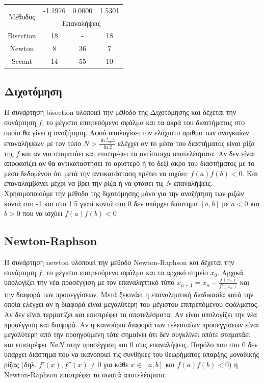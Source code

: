 \documentclass[a4paper,11pt]{article}
\begin{document}
\begin{flushleft}
    
    
\begin{table}[h]
    \centering
    \begin{tabular}{|c|c|c|c|}
        \hline
        \multirow{2}{*}{Μέθοδος} & -1.1976 & 0.0000 & 1.5301 \\ \cline{2-4}  & \multicolumn{3}{c|}{Επαναλήψεις} \\
        \hline
        Bisection & 18 & - & 18 \\ \hline
        Newton & 8 & 36 & 7 \\  \hline
        Secant & 14 & 55 & 10 \\ \hline
    \end{tabular}
\end{table}

\subsection*{Διχοτόμηση}
Η συνάρτηση bisection υλοποιεί την μέθοδο της Διχοτόμησης και δέχεται την συνάρτηση $f$, το μέγιστο επιτρεπόμενο σφάλμα και τα ακρά του διαστήματος στο οποίο θα γίνει η αναζήτηση. Αφού υπολογίσει τον ελάχιστο αριθμο των αναγκαίων επαναλήψεων με τον τύπο 
$N > \frac{\ln{\frac{b-a}{\epsilon}}}{\ln{2}}$ 
ελέγχει αν το μέσο του διαστήματος είναι ρίζα της $f$ και αν ναι σταματάει και επιστρέφει τα αντίστοιχα αποτελέσματα. Αν δεν είναι αποφασίζει αν θα αντικαταστήσει το αριστερό ή το δεξί άκρο του διαστήματος με το μέσο δεδομένου ότι μετά την αντικατάσταση πρέπει να ισχύει: $f(a)f(b)<0$. Και επαναλαμβάνει μέχρι να βρει την ρίζα ή να φτάσει τις $N$ επαναλήψεις. \newline
Χρησιμοποιούμε την μέθοδο της διχοτόμησης μόνο για την αναζήτηση των ριζών κοντά στο -1 και στο 1.5 γιατί κοντά στο 0 δεν υπάρχει διάστημα $[a,b]$ με $a<0$ και $b>0$ που να ισχύει $f(a)f(b)<0$ \newline

\subsection*{Newton-Raphson}
Η συνάρτηση newton υλοποιεί την μέθοδο Newton-Raphson και δέχεται την συνάρτηση $f$, το μέγιστο επιτρεπόμενο σφάλμα και το αρχικό σημείο $x_0$. Αρχικά υπολογίζει την νέα προσέγγιση με τον επαναληπτικό τύπο $x_{n+1} = x_n-\frac{f(x_n)}{f'(x_n)}$ και την διαφορά των προσεγγίσεων. Μετά ξεκινάει η επαναληπτική διαδικασία κατά την οποία ελέγχει αν η διαφορά είναι μεγαλύτερη του μέγιστου επιτρεπόμενου σφάλματος. Αν δεν είναι τερματίζει και επιστρέφει τα αποτελέσματα. Αν είναι υπολογίζει την νέα προσέγγιση και διαφορά. Αν η καινούρια διαφορά των τελευταίων προσεγγίσεων είναι μεγαλύτερη από την προηγούμενη τότε σημαίνει ότι δεν συγκλίνει οπότε σταματάει και επιστρέφει $NaN$ στην προσέγγιση και $0$ στις επαναλήψεις.\newline
Παρόλο που στο 0 δεν υπάρχει διάστημα που να ικανοποιεί τις συνθήκες του θεωρήματος ύπαρξης μοναδικής ρίζας (δηλ. $f'(x),f''(x)\neq0$ για κάθε $x\in[a,b]$ και $f(a)f(b)<0$) η Newton-Raphson επιστρέφει τα σωστά αποτελέσματα.
\newline


\end{flushleft}
\end{document}
